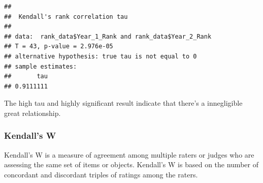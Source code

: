 \documentclass[
]{ctexart}
\newenvironment{Shaded}{\begin{snugshade}}{\end{snugshade}}
\newcommand{\AttributeTok}[1]{\textcolor[rgb]{0.13,0.29,0.53}{#1}}
\newcommand{\DecValTok}[1]{\textcolor[rgb]{0.00,0.00,0.81}{#1}}
\newcommand{\FunctionTok}[1]{\textcolor[rgb]{0.13,0.29,0.53}{\textbf{#1}}}
\newcommand{\NormalTok}[1]{#1}
\newcommand{\OtherTok}[1]{\textcolor[rgb]{0.56,0.35,0.01}{#1}}
\newcommand{\SpecialCharTok}[1]{\textcolor[rgb]{0.81,0.36,0.00}{\textbf{#1}}}
\newcommand{\StringTok}[1]{\textcolor[rgb]{0.31,0.60,0.02}{#1}}
\begin{document}
\begin{Shaded}
\end{Shaded}

\begin{verbatim}
## 
##  Kendall's rank correlation tau
## 
## data:  rank_data$Year_1_Rank and rank_data$Year_2_Rank
## T = 43, p-value = 2.976e-05
## alternative hypothesis: true tau is not equal to 0
## sample estimates:
##       tau 
## 0.9111111
\end{verbatim}

The high tau and highly significant result indicate that there's a
innegligible great relationship.

\hypertarget{kendalls-w}{%
\subsubsection{Kendall's W}\label{kendalls-w}}

Kendall's W is a measure of agreement among multiple raters or judges
who are assessing the same set of items or objects. Kendall's W is based
on the number of concordant and discordant triples of ratings among the
raters.
\end{document}
